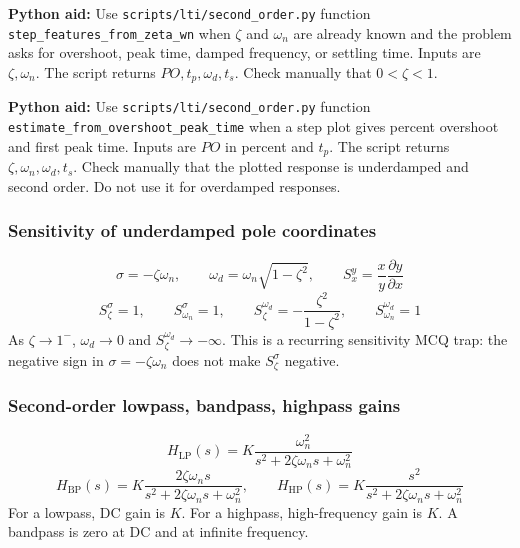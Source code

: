 \textbf{Python aid:} Use \texttt{scripts/lti/second\_order.py} function \texttt{step\_features\_from\_zeta\_wn} when \(\zeta\) and \(\omega_n\) are already known and the problem asks for overshoot, peak time, damped frequency, or settling time. Inputs are \(\zeta,\omega_n\). The script returns \(PO,t_p,\omega_d,t_s\). Check manually that \(0<\zeta<1\).

\textbf{Python aid:} Use \texttt{scripts/lti/second\_order.py} function \texttt{estimate\_from\_overshoot\_peak\_time} when a step plot gives percent overshoot and first peak time. Inputs are \(PO\) in percent and \(t_p\). The script returns \(\zeta,\omega_n,\omega_d,t_s\). Check manually that the plotted response is underdamped and second order. Do not use it for overdamped responses.

\subsubsection{Sensitivity of underdamped pole coordinates}
\[
\sigma=-\zeta\omega_n,\qquad \omega_d=\omega_n\sqrt{1-\zeta^2},\qquad
S_x^y=\frac{x}{y}\frac{\partial y}{\partial x}
\]
\[
S_{\zeta}^{\sigma}=1,\qquad S_{\omega_n}^{\sigma}=1,\qquad
S_{\zeta}^{\omega_d}=-\frac{\zeta^2}{1-\zeta^2},\qquad
S_{\omega_n}^{\omega_d}=1
\]
As \(\zeta\to1^-\), \(\omega_d\to0\) and \(S_{\zeta}^{\omega_d}\to-\infty\). This is a recurring sensitivity MCQ trap: the negative sign in \(\sigma=-\zeta\omega_n\) does not make \(S_{\zeta}^{\sigma}\) negative.

\subsubsection{Second-order lowpass, bandpass, highpass gains}
\[
H_{\mathrm{LP}}(s)=K\frac{\omega_n^2}{s^2+2\zeta\omega_n s+\omega_n^2}
\]
\[
H_{\mathrm{BP}}(s)=K\frac{2\zeta\omega_n s}{s^2+2\zeta\omega_n s+\omega_n^2},\qquad
H_{\mathrm{HP}}(s)=K\frac{s^2}{s^2+2\zeta\omega_n s+\omega_n^2}
\]
For a lowpass, DC gain is \(K\). For a highpass, high-frequency gain is \(K\). A bandpass is zero at DC and at infinite frequency.
